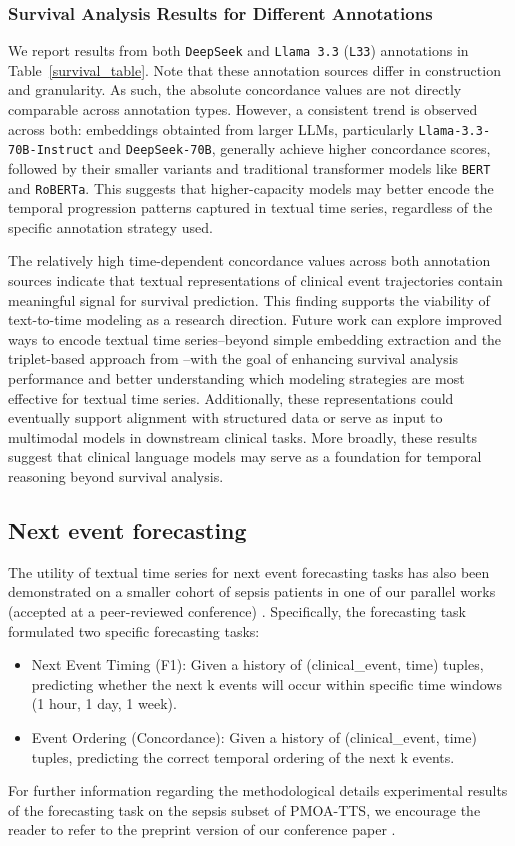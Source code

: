 %

\subsubsection{Survival Analysis Results for Different Annotations}
We report results from both \texttt{DeepSeek} and \texttt{Llama 3.3} (\texttt{L33}) annotations in Table~\ref{survival_table}. Note that these annotation sources differ in construction and granularity. As such, the absolute concordance values are not directly comparable across annotation types.
However, a consistent trend is observed across both: embeddings obtainted from larger LLMs, particularly \texttt{Llama-3.3-70B-Instruct} and \texttt{DeepSeek-70B}, generally achieve higher concordance scores, followed by their smaller variants and traditional transformer models like \texttt{BERT} and \texttt{RoBERTa}. 
This suggests that higher-capacity models may better encode the temporal progression patterns captured in textual time series, regardless of the specific annotation strategy used.

The relatively high time-dependent concordance values across both annotation sources indicate that textual representations of clinical event trajectories contain meaningful signal for survival prediction. This finding supports the viability of text-to-time modeling as a research direction. Future work can explore improved ways to encode textual time series--beyond simple embedding extraction and the triplet-based approach from \cite{oufattolemeds}--with the goal of enhancing survival analysis performance and better understanding which modeling strategies are most effective for textual time series. Additionally, these representations could eventually support alignment with structured data or serve as input to multimodal models in downstream clinical tasks. More broadly, these results suggest that clinical language models may serve as a foundation for temporal reasoning beyond survival analysis.

\subsection{Next event forecasting}

The utility of textual time series for next event forecasting tasks has also been demonstrated on a smaller cohort of sepsis patients in one of our parallel works (accepted at a peer-reviewed conference) \cite{noroozizadeh2025forecasting}. Specifically, the forecasting task formulated two specific forecasting tasks:
\begin{itemize}
    \item Next Event Timing (F1): Given a history of (clinical\_event, time) tuples, predicting whether the
next k events will occur within specific time windows (1 hour, 1 day, 1 week).
\item Event Ordering (Concordance): Given a history of (clinical\_event, time) tuples, predicting the
correct temporal ordering of the next k events.
\end{itemize}

For further information regarding the methodological details experimental results of the forecasting task on the sepsis subset of PMOA-TTS, we encourage the reader to refer to the preprint version of our conference paper \cite{noroozizadeh2025forecasting}.
